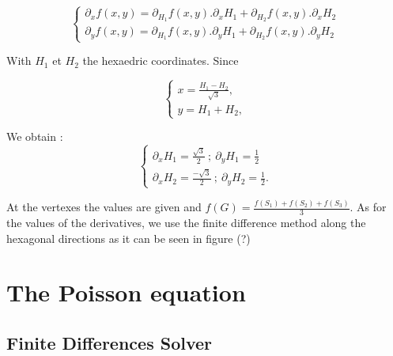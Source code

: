 \documentclass[proc]{edpsmath}
\begin{document}

\begin{equation}
\begin{cases}  

\partial _x f(x,y) = \partial _{H_1} f(x,y).   \partial _x H_1 +   \partial _{H_2} f(x,y).   \partial _x H_2  \\
\partial _y f(x,y) = \partial _{H_1} f(x,y).   \partial _y H_1 +   \partial _{H_2} f(x,y).   \partial _y H_2             

\end{cases}
\end{equation}

With $H_1$ et $H_2$ the  hexaedric coordinates. Since   

\begin{equation}
\begin{cases}  

\displaystyle{x = \frac{ H_1 - H_2 }{\sqrt{3}} },  \\[2mm]
\displaystyle{y =  H_1 + H_2 },        

\end{cases}
\end{equation}

We obtain :
\begin{equation}
	\begin{cases}  
       \displaystyle{  \partial _x H_1 = \frac{\sqrt{3}}{ 2} ~;~  \partial _y H_1 = \frac{1}{ 2}  }\\[2mm]
       \displaystyle{  \partial _x H_2 = \frac{-\sqrt{3}}{2} ~;~  \partial _y H_2 = \frac{1}{ 2}  } . 
\end{cases}	
\end{equation}

At the vertexes the values are given and $f(G) = \frac{f(S_1)+f(S_2)+f(S_3)}{3}$. As for the values of the derivatives, we use the finite difference method along the hexagonal directions as it can be seen in figure (?)


\section{The Poisson equation}
\label{sec:poisson_eqn}
\subsection{Finite Differences Solver}
\end{document}
